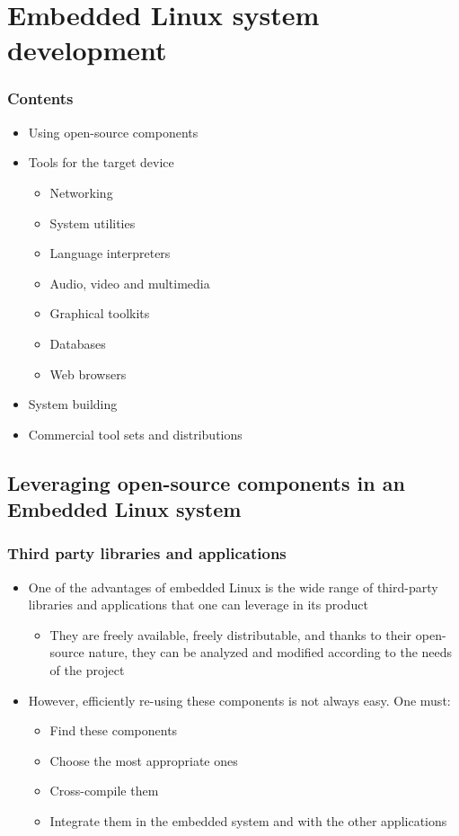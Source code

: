 \section{Embedded Linux system development}

\begin{frame}
  \frametitle{Contents}
  \begin{itemize}
  \item Using open-source components
  \item Tools for the target device
    \begin{itemize}
    \item Networking
    \item System utilities
    \item Language interpreters
    \item Audio, video and multimedia
    \item Graphical toolkits
    \item Databases
    \item Web browsers
    \end{itemize}
  \item System building
  \item Commercial tool sets and distributions
  \end{itemize}
\end{frame}

\subsection{Leveraging open-source components in an Embedded Linux
  system}

\begin{frame}
  \frametitle{Third party libraries and applications}
  \begin{itemize}
  \item One of the advantages of embedded Linux is the wide range of
    third-party libraries and applications that one can leverage in
    its product
    \begin{itemize}
    \item They are freely available, freely distributable, and thanks
      to their open-source nature, they can be analyzed and modified
      according to the needs of the project
    \end{itemize}
  \item However, efficiently re-using these components is not always
    easy. One must:
    \begin{itemize}
    \item Find these components
    \item Choose the most appropriate ones
    \item Cross-compile them
    \item Integrate them in the embedded system and with the other
      applications
    \end{itemize}
  \end{itemize}
\end{frame}

